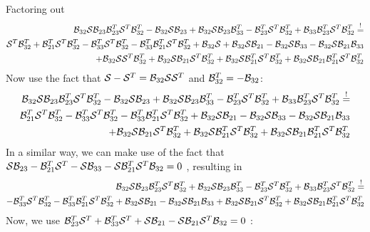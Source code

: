 \documentclass[]{scrartcl}
\numberwithin{equation}{section}
\begin{document}
\begin{landscape}

Factoring out
 \begin{align*}
 \B_{32} \S \B_{23} \B_{23}^T \S^T \B_{32}^T -\B_{32} \S \B_{23} + \B_{32} \S \B_{23} \B_{33}^T -\B_{23}^T \S^T \B_{32}^T
 + \B_{33} \B_{23}^T \S^T \B_{32}^T \stackrel{!}=\\
 \S^T \B_{32}^T + \B_{21}^T \S^T \B_{32}^T
   - \B_{33}^T \S^T \B_{32}^T - \B_{33}^T \B_{21}^T \S^T \B_{32}^T
 + \B_{32} \S + \B_{32} \S \B_{21}
 - \B_{32} \S \B_{33} -  \B_{32} \S \B_{21}\B_{33} \\
%
  +\B_{32} \S \S^T \B_{32}^T
  + \B_{32} \S \B_{21} \S^T \B_{32}^T
  + \B_{32} \S \B_{21}^T \S^T \B_{32}^T
  + \B_{32} \S \B_{21}\B_{21}^T \S^T \B_{32}^T
\end{align*}
%
Now use the fact that $\mathcal{S}-\mathcal{S}^T = \mathcal{B}_{32}\mathcal{S}\mathcal{S}^T$ and $\mathcal{B}_{32}^T=-\mathcal{B}_{32}$:
\begin{align*}
%
 \B_{32} \S \B_{23} \B_{23}^T \S^T \B_{32}^T -\B_{32} \S \B_{23} + \B_{32} \S \B_{23} \B_{33}^T -\B_{23}^T \S^T \B_{32}^T
 + \B_{33} \B_{23}^T \S^T \B_{32}^T \stackrel{!}=\\
 \B_{21}^T \S^T \B_{32}^T
   - \B_{33}^T \S^T \B_{32}^T - \B_{33}^T \B_{21}^T \S^T \B_{32}^T
 +\B_{32} \S \B_{21}
 - \B_{32} \S \B_{33} -  \B_{32} \S \B_{21}\B_{33} \\
%
  + \B_{32} \S \B_{21} \S^T \B_{32}^T
  + \B_{32} \S \B_{21}^T \S^T \B_{32}^T
  + \B_{32} \S \B_{21}\B_{21}^T \S^T \B_{32}^T
\end{align*}
%
In a similar way, we can make use of the fact that $\mathcal{S}\mathcal{B}_{23} -\mathcal{B}_{21}^T\mathcal{S}^T - \mathcal{S}\mathcal{B}_{33} -\mathcal{S}\mathcal{B}_{21}^T \mathcal{S}^T \mathcal{B}_{32} = 0$ , resulting in
\begin{align*}
%
 \B_{32} \S \B_{23} \B_{23}^T \S^T \B_{32}^T
 + \B_{32} \S \B_{23} \B_{33}^T -\B_{23}^T \S^T \B_{32}^T
 + \B_{33} \B_{23}^T \S^T \B_{32}^T \stackrel{!}=\\
   - \B_{33}^T \S^T \B_{32}^T - \B_{33}^T \B_{21}^T \S^T \B_{32}^T
 +\B_{32} \S \B_{21}
 -  \B_{32} \S \B_{21}\B_{33}
%
  + \B_{32} \S \B_{21} \S^T \B_{32}^T
  + \B_{32} \S \B_{21}\B_{21}^T \S^T \B_{32}^T
\end{align*}
Now, we use $\mathcal{B}_{23}^T\mathcal{S}^T +\mathcal{B}_{33}^T \mathcal{S}^T + \mathcal{S} \mathcal{B}_{21} - \mathcal{S}\mathcal{B}_{21} \mathcal{S}^T \mathcal{B}_{32} = 0$ :

\end{landscape}
\end{document}

